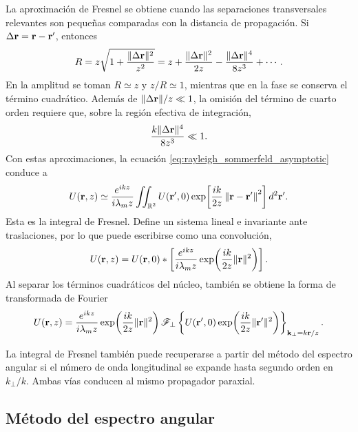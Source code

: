 La aproximación de Fresnel se obtiene cuando las separaciones transversales
relevantes son pequeñas comparadas con la distancia de propagación. Si
\(\Delta\vb r
=\vb r-\vb r'\), entonces
\begin{equation}
R
=
z\sqrt{1+\frac{\lVert\Delta\vb r\rVert^2}{z^2}}
=
z+\frac{\lVert\Delta\vb r\rVert^2}{2z}
-\frac{\lVert\Delta\vb r\rVert^4}{8z^3}
+\cdots.
\end{equation}
En la amplitud se toman \(R\simeq z\) y \(z/R\simeq1\), mientras que en la fase
se conserva el término cuadrático. Además de
\(\lVert\Delta\vb r\rVert/z\ll1\), la omisión del término de cuarto
orden requiere que, sobre la región efectiva de integración,
\begin{equation}
\frac{k\lVert\Delta\vb r\rVert^4}{8z^3}\ll1.
\label{eq:fresnel_validity}
\end{equation}
Con estas aproximaciones, la ecuación
\eqref{eq:rayleigh_sommerfeld_asymptotic} conduce a
\begin{equation}
U(\vb r,z)
\simeq
\frac{e^{ikz}}{i\lambda_m z}
\iint_{\mathbb R^2}
U(\vb r',0)
\exp\!\left[
\frac{ik}{2z}
\left\lVert
\vb r-\vb r'
\right\rVert^2
\right]
d^2\vb r'.
\label{eq:fresnel_integral}
\end{equation}
Esta es la integral de Fresnel. Define un sistema lineal e invariante ante
traslaciones, por lo que puede escribirse como una convolución,
\begin{equation}
U(\vb r,z)
=
U(\vb r,0)
*
\left[
\frac{e^{ikz}}{i\lambda_m z}
\exp\!\left(
\frac{ik}{2z}\lVert\vb r\rVert^2
\right)
\right].
\end{equation}
Al separar los términos cuadráticos del núcleo, también se obtiene la forma
de transformada de Fourier
\begin{equation}
U(\vb r,z)
=
\frac{e^{ikz}}{i\lambda_m z}
\exp\!\left(
\frac{ik}{2z}\lVert\vb r\rVert^2
\right)
\mathscr F_\perp
\left\{
U(\vb r',0)
\exp\!\left(
\frac{ik}{2z}\lVert\vb r'\rVert^2
\right)
\right\}_{\mathbf k_\perp
=k\vb r/z}.
\label{eq:fresnel_fourier_form}
\end{equation}

La integral de Fresnel también puede recuperarse a partir del método del
espectro angular si el número de onda longitudinal se expande hasta segundo
orden en \(k_\perp/k\). Ambas vías conducen al mismo propagador paraxial.

\subsection{Método del espectro angular}

